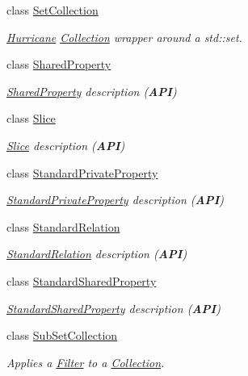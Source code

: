 \begin{DoxyCompactItemize}
class \mbox{\hyperlink{classHurricane_1_1SetCollection}{Set\+Collection}}
\begin{DoxyCompactList}\small\item\em \mbox{\hyperlink{namespaceHurricane}{Hurricane}} \mbox{\hyperlink{classHurricane_1_1Collection}{Collection}} wrapper around a std\+::set. \end{DoxyCompactList}\item 
class \mbox{\hyperlink{classHurricane_1_1SharedProperty}{Shared\+Property}}
\begin{DoxyCompactList}\small\item\em \mbox{\hyperlink{classHurricane_1_1SharedProperty}{Shared\+Property}} description ({\bfseries A\+PI}) \end{DoxyCompactList}\item 
class \mbox{\hyperlink{classHurricane_1_1Slice}{Slice}}
\begin{DoxyCompactList}\small\item\em \mbox{\hyperlink{classHurricane_1_1Slice}{Slice}} description ({\bfseries A\+PI}) \end{DoxyCompactList}\item 
class \mbox{\hyperlink{classHurricane_1_1StandardPrivateProperty}{Standard\+Private\+Property}}
\begin{DoxyCompactList}\small\item\em \mbox{\hyperlink{classHurricane_1_1StandardPrivateProperty}{Standard\+Private\+Property}} description ({\bfseries A\+PI}) \end{DoxyCompactList}\item 
class \mbox{\hyperlink{classHurricane_1_1StandardRelation}{Standard\+Relation}}
\begin{DoxyCompactList}\small\item\em \mbox{\hyperlink{classHurricane_1_1StandardRelation}{Standard\+Relation}} description ({\bfseries A\+PI}) \end{DoxyCompactList}\item 
class \mbox{\hyperlink{classHurricane_1_1StandardSharedProperty}{Standard\+Shared\+Property}}
\begin{DoxyCompactList}\small\item\em \mbox{\hyperlink{classHurricane_1_1StandardSharedProperty}{Standard\+Shared\+Property}} description ({\bfseries A\+PI}) \end{DoxyCompactList}\item 
class \mbox{\hyperlink{classHurricane_1_1SubSetCollection}{Sub\+Set\+Collection}}
\begin{DoxyCompactList}\small\item\em Applies a \mbox{\hyperlink{classHurricane_1_1Filter}{Filter}} to a \mbox{\hyperlink{classHurricane_1_1Collection}{Collection}}. \end{DoxyCompactList}\item 

\end{DoxyCompactItemize}
